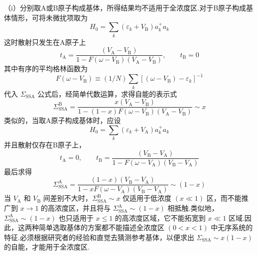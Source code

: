 （i）分别取A或B原子构成基体，所得结果均不适用于全浓度区.对于B原子构成基体情形，可将未微扰项取为
\begin{equation}
  H_{0}=\sum_{k}\left(\varepsilon_{k}+V_{\mathrm{B}}\right)a_{k}^{+}a_{k}
\end{equation}
这时散射只发生在A原子上
\begin{equation*}
  t_{\mathrm{A}}=\frac{\left(V_{\mathrm{A}}-V_{\mathrm{B}}\right)}
  {1-F\left(\omega-V_{\mathrm{B}}\right)\left(V_{\mathrm{A}}-V_{\mathrm{B}}\right)},\qquad
  t_{\mathrm{B}}=0
\end{equation*}
其中有序的平均格林函数为
\begin{equation*}
  F\left(\omega-V_{\mathrm{B}}\right)\equiv\left(1/N\right)\sum_{k}
  \left[\left(\omega-V_{\mathrm{B}}\right)-\varepsilon_{k}\right]^{-1}
\end{equation*}
代入 $\Sigma_{\mathrm{SSA}}$ 公式后，经简单代数运算，求得自能的表示式
\begin{equation}
  \Sigma_{\mathrm{SSA}}^{\mathrm{B}}
  =\frac{x\left(V_{\mathrm{A}}-V_{\mathrm{B}}\right)}
  {1-\left(1-x\right)F\left(\omega-V_{\mathrm{B}}\right)\left(V_{\mathrm{A}}-V_{\mathrm{B}}\right)}
  \sim x
\end{equation}
类似的，当取A原子构成基体时，应设
\begin{equation}
  H_{0}=\sum_{k}\left(\varepsilon_{k}+V_{\mathrm{A}}\right)a_{k}^{+}a_{k}
\end{equation}
并且散射仅存在B原子上，
\begin{equation*}
  t_{\mathrm{A}}=0,\qquad
  t_{\mathrm{B}}=\frac{\left(V_{\mathrm{B}}-V_{\mathrm{A}}\right)}
  {1-F\left(\omega-V_{\mathrm{A}}\right)\left(V_{\mathrm{B}}-V_{\mathrm{A}}\right)}
\end{equation*}
最后求得
\begin{equation}
  \Sigma_{\mathrm{SSA}}^{\mathrm{A}}
  =\frac{\left(1-x\right)\left(V_{\mathrm{B}}-V_{\mathrm{A}}\right)}
  {1-xF\left(\omega-V_{\mathrm{A}}\right)\left(V_{\mathrm{B}}-V_{\mathrm{A}}\right)}
  \sim\left(1-x\right)
\end{equation}
当 $V_{\mathrm{A}}$ 和 $V_{\mathrm{B}}$ 间差别不大时，$\Sigma_{\mathrm{SSA}}^{\mathrm{B}}\sim x$ 仅适用于低浓度 $\left(x\ll1\right)$ 区，而不能推广到 $x\rightarrow1$ 的高浓度区，并且将与 $\Sigma_{\mathrm{SSA}}^{\mathrm{A}}\sim\left(1-x\right)$ 相抵触.类似地，$\Sigma_{\mathrm{SSA}}^{\mathrm{A}}\sim\left(1-x\right)$ 也只适用于 $x\leqslant1$ 的高浓度区域，它不能拓宽到 $x\ll1$ 区域.因此，这两种简单选取基体的方案都不能描述全浓度区 $\left(0<x<1\right)$ 中无序系统的特征.必须根据研究者的经验和直觉去猜测参考基体，以便求出 $\Sigma_{\mathrm{SSA}}\sim x\left(1-x\right)$ 的自能，才能用于全浓度区.

